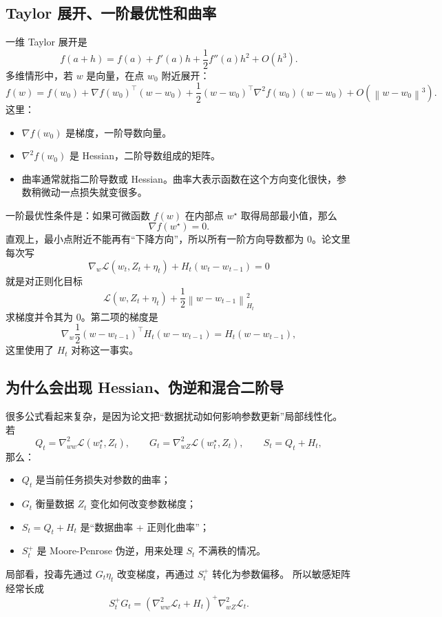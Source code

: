 \documentclass[UTF8,fontset=none,11pt]{ctexart}
\theoremstyle{cnstyle}
\newcommand{\calL}{\mathcal{L}}
\newcommand{\norm}[1]{\left\lVert #1\right\rVert}
\begin{document}
\subsection{Taylor 展开、一阶最优性和曲率}

一维 Taylor 展开是
\[
  f(a+h)
  =
  f(a)+f'(a)h+\frac12f''(a)h^2+O(h^3).
\]
多维情形中，若 \(w\) 是向量，在点 \(w_0\) 附近展开：
\[
  f(w)
  =
  f(w_0)
  +\nabla f(w_0)^\top(w-w_0)
  +\frac12(w-w_0)^\top\nabla^2f(w_0)(w-w_0)
  +O(\norm{w-w_0}^3).
\]
这里：
\begin{itemize}
  \item \(\nabla f(w_0)\) 是梯度，一阶导数向量。
  \item \(\nabla^2 f(w_0)\) 是 Hessian，二阶导数组成的矩阵。
  \item 曲率通常就指二阶导数或 Hessian。曲率大表示函数在这个方向变化很快，参数稍微动一点损失就变很多。
\end{itemize}

一阶最优性条件是：如果可微函数 \(f(w)\) 在内部点 \(w^\star\) 取得局部最小值，那么
\[
  \nabla f(w^\star)=0.
\]
直观上，最小点附近不能再有“下降方向”，所以所有一阶方向导数都为 0。论文里每次写
\[
  \nabla_w\calL(w_t,Z_t+\eta_t)+H_t(w_t-w_{t-1})=0
\]
就是对正则化目标
\[
  \calL(w,Z_t+\eta_t)+\frac12\norm{w-w_{t-1}}_{H_t}^2
\]
求梯度并令其为 0。第二项的梯度是
\[
  \nabla_w\frac12(w-w_{t-1})^\top H_t(w-w_{t-1})
  =
  H_t(w-w_{t-1}),
\]
这里使用了 \(H_t\) 对称这一事实。

\subsection{为什么会出现 Hessian、伪逆和混合二阶导}

很多公式看起来复杂，是因为论文把“数据扰动如何影响参数更新”局部线性化。
若
\[
  Q_t=\nabla_{ww}^2\calL(w_t^\star,Z_t),
  \qquad
  G_t=\nabla_{wZ}^2\calL(w_t^\star,Z_t),
  \qquad
  S_t=Q_t+H_t,
\]
那么：
\begin{itemize}
  \item \(Q_t\) 是当前任务损失对参数的曲率；
  \item \(G_t\) 衡量数据 \(Z_t\) 变化如何改变参数梯度；
  \item \(S_t=Q_t+H_t\) 是“数据曲率 + 正则化曲率”；
  \item \(S_t^+\) 是 Moore-Penrose 伪逆，用来处理 \(S_t\) 不满秩的情况。
\end{itemize}

局部看，投毒先通过 \(G_t\eta_t\) 改变梯度，再通过 \(S_t^+\) 转化为参数偏移。
所以敏感矩阵经常长成
\[
  S_t^+G_t
  =
  (\nabla_{ww}^2\calL_t+H_t)^+
  \nabla_{wZ}^2\calL_t .
\]
\end{document}
